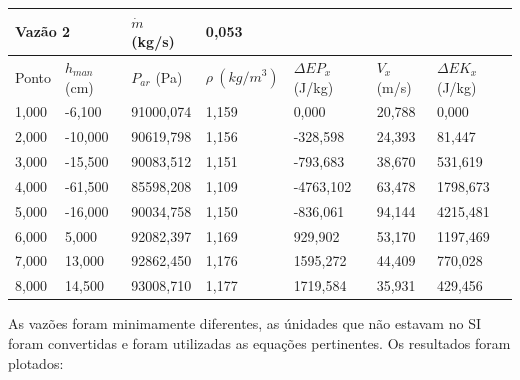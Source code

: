 \documentclass[12pt, twoside, a4]{article}
\begin{document}
\begin{table}[H]
    \begin{tabular}{|ll|l|l|lll}
    \cline{1-4}
    \multicolumn{2}{|l|}{Vazão 2}         & $ \dot{m} $ (kg/s) & 0,053 &                                &                             &                               \\ \hline
    \multicolumn{1}{|l|}{Ponto} &
      $h_{man}$ (cm) &
      $P_{ar}$ (Pa) &
      $\rho \ (kg / m^3)$ &
      \multicolumn{1}{l|}{$ \Delta EP_x $ (J/kg)} &
      \multicolumn{1}{l|}{$V_x$ (m/s)} &
      \multicolumn{1}{l|}{$ \Delta EK_x $ (J/kg)} \\ \hline
    \multicolumn{1}{|l|}{1,000} & -6,100  & 91000,074          & 1,159 & \multicolumn{1}{l|}{0,000}     & \multicolumn{1}{l|}{20,788} & \multicolumn{1}{l|}{0,000}    \\ \hline
    \multicolumn{1}{|l|}{2,000} & -10,000 & 90619,798          & 1,156 & \multicolumn{1}{l|}{-328,598}  & \multicolumn{1}{l|}{24,393} & \multicolumn{1}{l|}{81,447}   \\ \hline
    \multicolumn{1}{|l|}{3,000} & -15,500 & 90083,512          & 1,151 & \multicolumn{1}{l|}{-793,683}  & \multicolumn{1}{l|}{38,670} & \multicolumn{1}{l|}{531,619}  \\ \hline
    \multicolumn{1}{|l|}{4,000} & -61,500 & 85598,208          & 1,109 & \multicolumn{1}{l|}{-4763,102} & \multicolumn{1}{l|}{63,478} & \multicolumn{1}{l|}{1798,673} \\ \hline
    \multicolumn{1}{|l|}{5,000} & -16,000 & 90034,758          & 1,150 & \multicolumn{1}{l|}{-836,061}  & \multicolumn{1}{l|}{94,144} & \multicolumn{1}{l|}{4215,481} \\ \hline
    \multicolumn{1}{|l|}{6,000} & 5,000   & 92082,397          & 1,169 & \multicolumn{1}{l|}{929,902}   & \multicolumn{1}{l|}{53,170} & \multicolumn{1}{l|}{1197,469} \\ \hline
    \multicolumn{1}{|l|}{7,000} & 13,000  & 92862,450          & 1,176 & \multicolumn{1}{l|}{1595,272}  & \multicolumn{1}{l|}{44,409} & \multicolumn{1}{l|}{770,028}  \\ \hline
    \multicolumn{1}{|l|}{8,000} & 14,500  & 93008,710          & 1,177 & \multicolumn{1}{l|}{1719,584}  & \multicolumn{1}{l|}{35,931} & \multicolumn{1}{l|}{429,456}  \\ \hline
    \end{tabular}
\end{table}

As vazões foram minimamente diferentes, as únidades que não estavam no SI foram convertidas e foram utilizadas as equações pertinentes.
Os resultados foram plotados:
\end{document}
